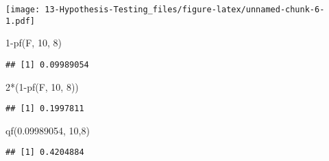 \documentclass[
]{book}
\newenvironment{Shaded}{\begin{snugshade}}{\end{snugshade}}
\newcommand{\DecValTok}[1]{\textcolor[rgb]{0.00,0.00,0.81}{#1}}
\newcommand{\FloatTok}[1]{\textcolor[rgb]{0.00,0.00,0.81}{#1}}
\newcommand{\FunctionTok}[1]{\textcolor[rgb]{0.00,0.00,0.00}{#1}}
\newcommand{\NormalTok}[1]{#1}
\newcommand{\SpecialCharTok}[1]{\textcolor[rgb]{0.00,0.00,0.00}{#1}}
\begin{document}
\texttt{[image: 13-Hypothesis-Testing\_files/figure-latex/unnamed-chunk-6-1.pdf]}

\begin{Shaded}
\begin{Highlighting}[]
\DecValTok{1}\SpecialCharTok{{-}}\FunctionTok{pf}\NormalTok{(F, }\DecValTok{10}\NormalTok{, }\DecValTok{8}\NormalTok{)}
\end{Highlighting}
\end{Shaded}

\begin{verbatim}
## [1] 0.09989054
\end{verbatim}

\begin{Shaded}
\begin{Highlighting}[]
\DecValTok{2}\SpecialCharTok{*}\NormalTok{(}\DecValTok{1}\SpecialCharTok{{-}}\FunctionTok{pf}\NormalTok{(F, }\DecValTok{10}\NormalTok{, }\DecValTok{8}\NormalTok{))}
\end{Highlighting}
\end{Shaded}

\begin{verbatim}
## [1] 0.1997811
\end{verbatim}

\begin{Shaded}
\begin{Highlighting}[]
\FunctionTok{qf}\NormalTok{(}\FloatTok{0.09989054}\NormalTok{, }\DecValTok{10}\NormalTok{,}\DecValTok{8}\NormalTok{)}
\end{Highlighting}
\end{Shaded}

\begin{verbatim}
## [1] 0.4204884
\end{verbatim}
\end{document}
